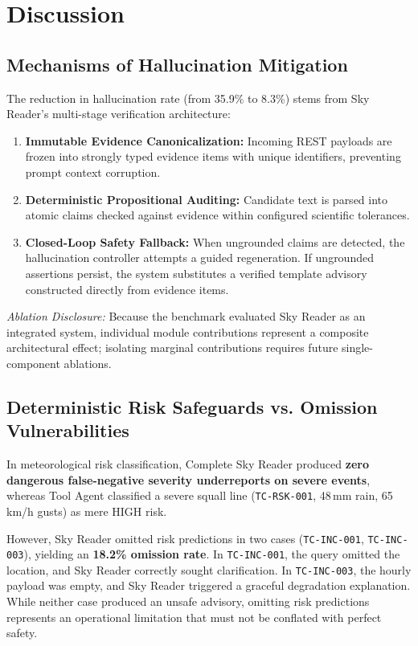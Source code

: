 \documentclass[conference]{IEEEtran}
\begin{document}
\section{Discussion}

\subsection{Mechanisms of Hallucination Mitigation}
The reduction in hallucination rate (from 35.9\% to 8.3\%) stems from Sky Reader's multi-stage verification architecture:
\begin{enumerate}
    \item \textbf{Immutable Evidence Canonicalization:} Incoming REST payloads are frozen into strongly typed evidence items with unique identifiers, preventing prompt context corruption.
    \item \textbf{Deterministic Propositional Auditing:} Candidate text is parsed into atomic claims checked against evidence within configured scientific tolerances.
    \item \textbf{Closed-Loop Safety Fallback:} When ungrounded claims are detected, the hallucination controller attempts a guided regeneration. If ungrounded assertions persist, the system substitutes a verified template advisory constructed directly from evidence items.
\end{enumerate}

\textit{Ablation Disclosure:} Because the benchmark evaluated Sky Reader as an integrated system, individual module contributions represent a composite architectural effect; isolating marginal contributions requires future single-component ablations.

\subsection{Deterministic Risk Safeguards vs. Omission Vulnerabilities}
In meteorological risk classification, Complete Sky Reader produced \textbf{zero dangerous false-negative severity underreports on severe events}, whereas Tool Agent classified a severe squall line (\texttt{TC-RSK-001}, 48\,mm rain, 65\,km/h gusts) as mere HIGH risk.

However, Sky Reader omitted risk predictions in two cases (\texttt{TC-INC-001}, \texttt{TC-INC-003}), yielding an \textbf{18.2\% omission rate}. In \texttt{TC-INC-001}, the query omitted the location, and Sky Reader correctly sought clarification. In \texttt{TC-INC-003}, the hourly payload was empty, and Sky Reader triggered a graceful degradation explanation. While neither case produced an unsafe advisory, omitting risk predictions represents an operational limitation that must not be conflated with perfect safety.
\end{document}
